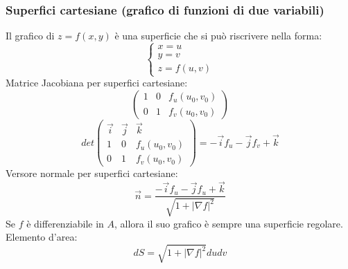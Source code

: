 \subsubsection*{Superfici cartesiane (grafico di funzioni di due variabili)}
\begin{tcolorbox}
Il grafico di $z = f(x,y)$ è una superficie che si può riscrivere nella forma:
\[
    \begin{cases}
        x= u\\
        y=v\\
        z = f(u,v)
    \end{cases}
\]
Matrice Jacobiana per superfici cartesiane:
\[
    \left( \begin{matrix}
        1 & 0 & f_u(u_0,v_0) \\
        0 & 1 & f_v(u_0,v_0) 
    \end{matrix} \right)
\]
\[
    det\left( \begin{matrix}
        \vec{i} & \vec{j} & \vec{k} \\
        1 & 0 & f_u(u_0,v_0) \\
        0 & 1 & f_v(u_0,v_0) 
    \end{matrix} \right)= -\vec{i}f_u -\vec{j} f_v + \vec{k}
\]
Versore normale per superfici cartesiane:
\[
    \vec{n} =\frac{-\vec{i}f_u -\vec{j} f_u + \vec{k}}{\sqrt{1 + |\nabla f|^2}}
\]
Se $f$ è differenziabile in $A$, allora il suo grafico è sempre una superficie regolare.\newline
\newline
Elemento d'area:
\[
    dS = \sqrt{1 + |\nabla f|^2} du dv
\]
\end{tcolorbox}

